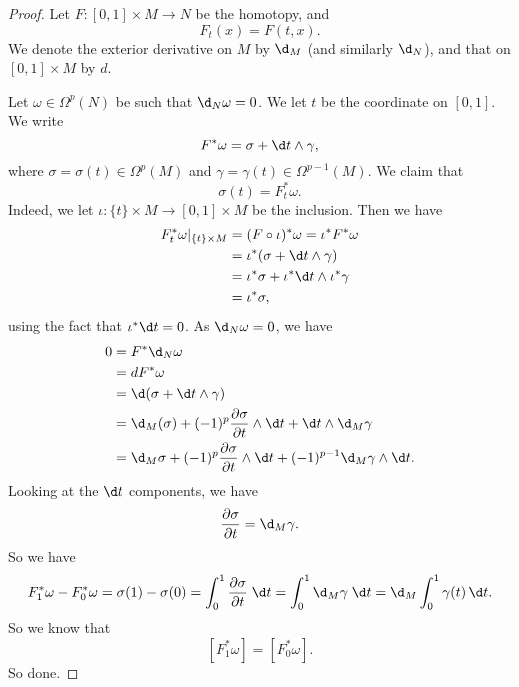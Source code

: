\documentclass[a4paper]{article}
\begin{document}
\begin{proof}
  Let $F: [0, 1] \times M \to N$ be the homotopy, and
  \[
    F_t(x) = F(t, x).
  \]
  We denote the exterior derivative on $M$ by $\d_M$ (and similarly $\d_N$), and that on $[0, 1] \times M$ by $d$.

  Let $\omega \in \Omega^p(N)$ be such that $\d_N \omega = 0$. We let $t$ be the coordinate on $[0, 1]$. We write
  \[
    F^* \omega = \sigma + \d t \wedge \gamma,
  \]
  where $\sigma = \sigma(t) \in \Omega^p(M)$ and $\gamma = \gamma(t) \in \Omega^{p - 1}(M)$. We claim that
  \[
    \sigma(t) = F_t^* \omega.
  \]
  Indeed, we let $\iota: \{t\} \times M \to [0, 1] \times M$ be the inclusion. Then we have
  \begin{align*}
    F_t^* \omega |_{\{t\} \times M} &= (F \circ \iota)^* \omega = \iota^* F^* \omega \\
    &= \iota^* (\sigma + \d t \wedge \gamma)\\
    &= \iota^* \sigma + \iota^* \d t \wedge \iota^* \gamma\\
    &= \iota^* \sigma,
  \end{align*}
  using the fact that $\iota^* \d t = 0$. As $\d_N \omega = 0$, we have
  \begin{align*}
    0 &= F^* \d_N \omega \\
    &= d F^* \omega \\
    &= \d(\sigma + \d t \wedge \gamma)\\
    &= \d_M(\sigma) + (-1)^p\frac{\partial \sigma}{\partial t} \wedge \d t + \d t \wedge \d_M \gamma\\
    &= \d_M \sigma + (-1)^p \frac{\partial \sigma}{\partial t} \wedge \d t + (-1)^{p - 1} \d_M \gamma \wedge \d t.
  \end{align*}
  Looking at the $\d t$ components, we have
  \[
    \frac{\partial \sigma}{\partial t} = \d_M \gamma.
  \]
  So we have
  \[
    F_1^* \omega - F_0^* \omega = \sigma(1) - \sigma(0) = \int_0^1 \frac{\partial \sigma}{\partial t} \;\d t = \int_0^1 \d_M \gamma \;\d t = \d_M \int_0^1 \gamma(t) \, \d t.
  \]
  So we know that
  \[
    [F_1^* \omega] = [F_0^* \omega].
  \]
  So done.
\end{proof}
\end{document}
